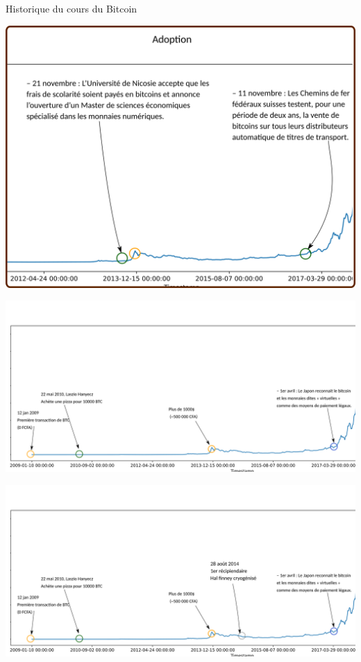 \documentclass[presentation]{beamer}
\begin{document}
\begin{frame}[label={sec:org6ff9387}]{Historique du cours du Bitcoin}
\begin{block}{}
\begin{center}
\includegraphics[width=.95\textwidth]{./Pictures/Timeline/26adoption_train.png}
\end{center}
\end{block}

\begin{block}{}
\begin{center}
\includegraphics[width=1\textwidth]{./Pictures/Timeline/30hal_finney.png}
\end{center}
\end{block}

\begin{block}{}
\begin{center}
\includegraphics[width=1\textwidth]{./Pictures/Timeline/31hal_finney.png}
\end{center}
\end{block}


\end{frame}
\end{document}
